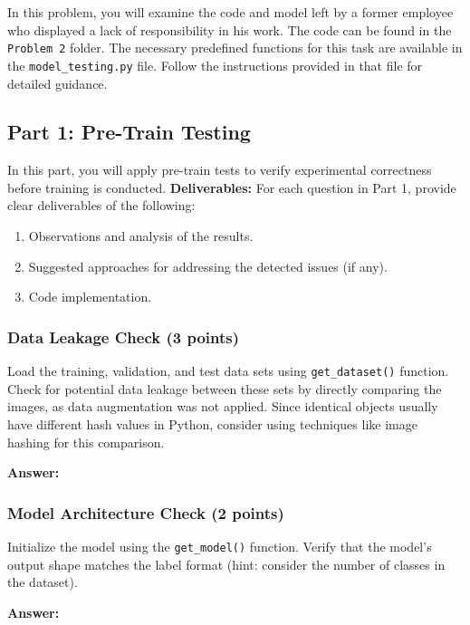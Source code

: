 \documentclass[11pt, oneside]{article}   	%
\begin{document}
In this problem, you will examine the code and model left by a former employee who displayed a lack of responsibility in his work. The code can be found in the \texttt{Problem 2} folder. The necessary predefined functions for this task are available in the \texttt{model\_testing.py} file. Follow the instructions provided in that file for detailed guidance.

\subsection*{Part 1: Pre-Train Testing}

In this part, you will apply pre-train tests to verify experimental correctness before training is conducted. \noindent\textbf{Deliverables:} For each question in Part 1, provide clear deliverables of the following:
\begin{enumerate}
    \item Observations and analysis of the results.
    \item Suggested approaches for addressing the detected issues (if any).
    \item Code implementation.
\end{enumerate}

\subsubsection*{Data Leakage Check (3 points)}
Load the training, validation, and test data sets using \texttt{get\_dataset()} function. Check for potential data leakage between these sets by directly comparing the images, as data augmentation was not applied. Since identical objects usually have different hash values in Python, consider using techniques like image hashing for this comparison.

\begin{answerbox} \textbf{Answer:} \vspace*{1cm}

\end{answerbox}

\subsubsection*{Model Architecture Check (2 points)}
Initialize the model using the \texttt{get\_model()} function. Verify that the model’s output shape matches the label format (hint: consider the number of classes in the dataset).

\begin{answerbox} \textbf{Answer:} \vspace*{1cm}

\end{answerbox} 
\end{document}
